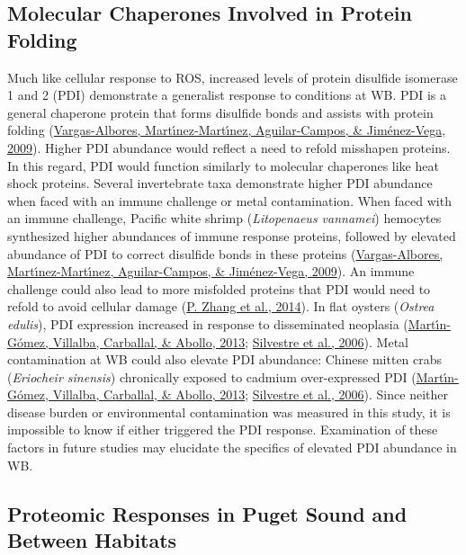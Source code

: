 \documentclass [11pt, proquest] {uwthesis}[2015/03/03]
\begin{document}
\hypertarget{molecular-chaperones-involved-in-protein-folding}{%
\subsection{Molecular Chaperones Involved in Protein Folding}\label{molecular-chaperones-involved-in-protein-folding}}

Much like cellular response to ROS, increased levels of protein disulfide isomerase 1 and 2 (PDI) demonstrate a generalist response to conditions at WB. PDI is a general chaperone protein that forms disulfide bonds and assists with protein folding (\protect\hyperlink{ref-Vargas-Albores2009}{Vargas-Albores, Martı́nez-Martı́nez, Aguilar-Campos, \& Jiménez-Vega, 2009}). Higher PDI abundance would reflect a need to refold misshapen proteins. In this regard, PDI would function similarly to molecular chaperones like heat shock proteins. Several invertebrate taxa demonstrate higher PDI abundance when faced with an immune challenge or metal contamination. When faced with an immune challenge, Pacific white shrimp (\emph{Litopenaeus vannamei}) hemocytes synthesized higher abundances of immune response proteins, followed by elevated abundance of PDI to correct disulfide bonds in these proteins (\protect\hyperlink{ref-Vargas-Albores2009}{Vargas-Albores, Martı́nez-Martı́nez, Aguilar-Campos, \& Jiménez-Vega, 2009}). An immune challenge could also lead to more misfolded proteins that PDI would need to refold to avoid cellular damage (\protect\hyperlink{ref-Zhang2014}{P. Zhang et al., 2014}). In flat oysters (\emph{Ostrea edulis}), PDI expression increased in response to disseminated neoplasia (\protect\hyperlink{ref-Martin-Gomez2013}{Martı́n-Gómez, Villalba, Carballal, \& Abollo, 2013}; \protect\hyperlink{ref-Silvestre2006}{Silvestre et al., 2006}). Metal contamination at WB could also elevate PDI abundance: Chinese mitten crabs (\emph{Eriocheir sinensis}) chronically exposed to cadmium over-expressed PDI (\protect\hyperlink{ref-Martin-Gomez2013}{Martı́n-Gómez, Villalba, Carballal, \& Abollo, 2013}; \protect\hyperlink{ref-Silvestre2006}{Silvestre et al., 2006}). Since neither disease burden or environmental contamination was measured in this study, it is impossible to know if either triggered the PDI response. Examination of these factors in future studies may elucidate the specifics of elevated PDI abundance in WB.

\hypertarget{proteomic-responses-in-puget-sound-and-between-habitats}{%
\subsection{Proteomic Responses in Puget Sound and Between Habitats}\label{proteomic-responses-in-puget-sound-and-between-habitats}}
\end{document}
